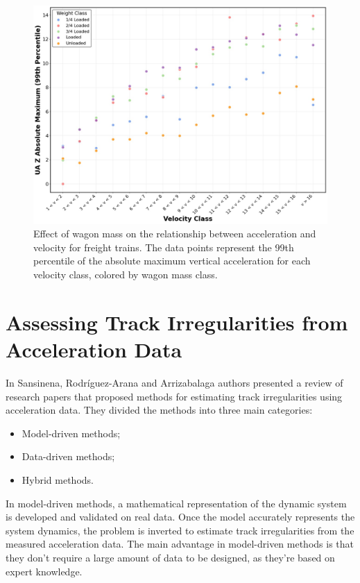 \begin{figure}[H]
    \centering
    \includegraphics[width=12cm]{Cap2_LitReview/Mass_effect/Mass_effect.jpg}
    \caption{Effect of wagon mass on the relationship between acceleration and velocity for freight trains. The data points represent the 99th percentile of the absolute maximum vertical acceleration for each velocity class, colored by wagon mass class.}
    \label{fig:mass_effect}
\end{figure}

\section{Assessing Track Irregularities from Acceleration Data} \label{sec-track-quality-accel}

In Sansinena, Rodríguez-Arana and Arrizabalaga \cite{Sansinena26032025} authors presented a review of research papers that proposed methods for estimating track irregularities using acceleration data. They divided the methods into three main categories:
\begin{itemize}
    \item Model-driven methods;
    \item Data-driven methods;
    \item Hybrid methods.
\end{itemize}

In model-driven methods, a mathematical representation of the dynamic system is developed and validated on real data. Once the model accurately represents the system dynamics, the problem is inverted to estimate track irregularities from the measured acceleration data. The main advantage in model-driven methods is that they don't require a large amount of data to be designed, as they're based on expert knowledge. 

